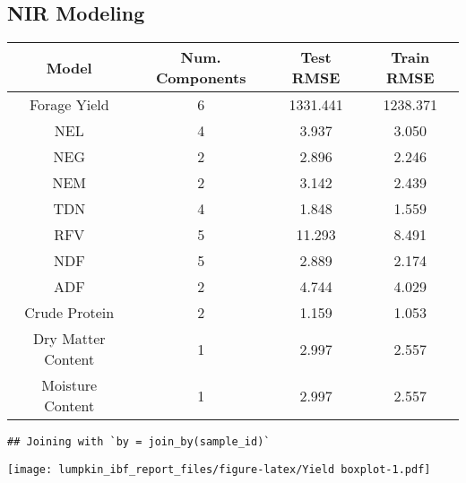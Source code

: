 \documentclass[
]{article}
\begin{document}
\subsection{NIR Modeling}\label{nir-modeling-1}

\begin{longtable}[]{@{}cccc@{}}
\toprule\noalign{}
Model & Num. Components & Test RMSE & Train RMSE \\
\midrule\noalign{}
\endhead
\bottomrule\noalign{}
\endlastfoot
Forage Yield & 6 & 1331.441 & 1238.371 \\
NEL & 4 & 3.937 & 3.050 \\
NEG & 2 & 2.896 & 2.246 \\
NEM & 2 & 3.142 & 2.439 \\
TDN & 4 & 1.848 & 1.559 \\
RFV & 5 & 11.293 & 8.491 \\
NDF & 5 & 2.889 & 2.174 \\
ADF & 2 & 4.744 & 4.029 \\
Crude Protein & 2 & 1.159 & 1.053 \\
Dry Matter Content & 1 & 2.997 & 2.557 \\
Moisture Content & 1 & 2.997 & 2.557 \\
\end{longtable}

\begin{verbatim}
## Joining with `by = join_by(sample_id)`
\end{verbatim}

\texttt{[image: lumpkin\_ibf\_report\_files/figure-latex/Yield boxplot-1.pdf]}
\end{document}
